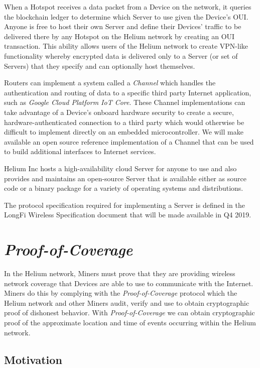 \documentclass[10pt, nonatbib, nocopyrightspace, reprint]{sigplanconf}
\begin{document}
When a Hotspot receives a data packet from a Device on the network, it queries the blockchain ledger to determine which Server to use given the Device's OUI. Anyone is free to host their own Server and define their Devices' traffic to be delivered there by any Hotspot on the Helium network by creating an OUI transaction. This ability allows users of the Helium network to create VPN-like functionality whereby encrypted data is delivered only to a Server (or set of Servers) that they specify and can optionally host themselves.

Routers can implement a system called a \emph{Channel} which handles the authentication and routing of data to a specific third party Internet application, such as \emph{Google Cloud Platform IoT Core}. These Channel implementations can take advantage of a Device's onboard hardware security to create a secure, hardware-authenticated connection to a third party which would otherwise be difficult to implement directly on an embedded microcontroller. We will make available an open source reference implementation of a Channel that can be used to build additional interfaces to Internet services.

Helium Inc hosts a high-availability cloud Server for anyone to use and also provides and maintains an open-source Server that is available either as source code or a binary package for a variety of operating systems and distributions.

The protocol specification required for implementing a Server is defined in the LongFi Wireless Specification document that will be made available in Q4 2019.

\section{\emph{Proof-of-Coverage}}\label{poc}

In the Helium network, Miners must prove that they are providing wireless network coverage that Devices are able to use to communicate with the Internet. Miners do this by complying with the \emph{Proof-of-Coverage} protocol which the Helium network and other Miners audit, verify and use to obtain cryptographic proof of dishonest behavior. With \emph{Proof-of-Coverage} we can obtain cryptographic proof of the approximate location and time of events occurring within the Helium network.

\subsection{Motivation}
\end{document}
